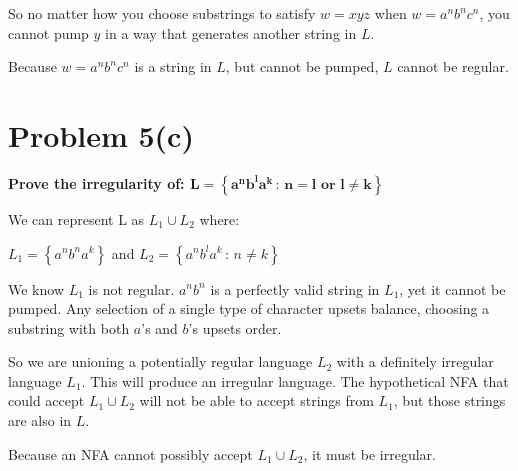 \documentclass{report}
\begin{document}
So no matter how you choose substrings to satisfy $w = xyz$ when $w = a^n b^n c^n$, you cannot pump $y$ in a way that generates another string in $L$.

Because $w = a^n b^n c^n$ is a string in $L$, but cannot be pumped, $L$ cannot be regular.


\section*{Problem 5(c)}
\textbf{Prove the irregularity of: $\mathbf{L = \left\{a^n b^l a^k \, : \,  n = l \text{ or } l \neq k \right\}}$}


We can represent L as $L_1 \cup L_2$ where:

$L_1 = \left\{ a^n b^n a^k \right\}$ and $ L_2 = \left\{ a^n b^l a^k \, : \, n \neq k\right\}$

We know $L_1$ is not regular. $a^n b^n$ is a perfectly valid string in $L_1$, yet it cannot be pumped. Any selection of a single type of character upsets balance, choosing a substring with both $a$'s and $b$'s upsets order.

So we are unioning a potentially regular language $L_2$ with a definitely irregular language $L_1$. This will produce an irregular language.
The hypothetical NFA that could accept $L_1 \cup L_2$ will not be able to accept strings from $L_1$, but those strings are also in $L$.

Because an NFA cannot possibly accept $L_1 \cup L_2$, it must be irregular.
\end{document}

